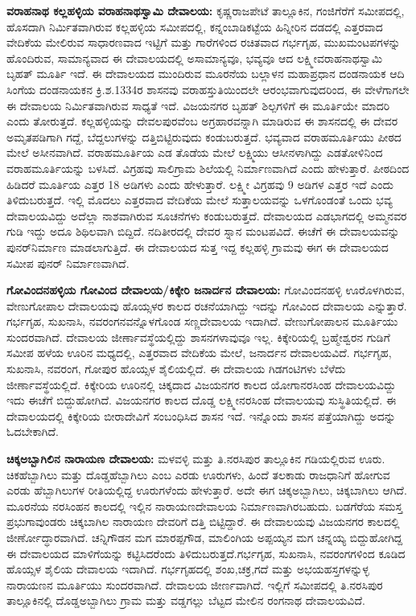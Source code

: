\textbf{ವರಾಹನಾಥ ಕಲ್ಲಹಳ್ಳಿಯ ವರಾಹನಾಥಸ್ವಾಮಿ ದೇವಾಲಯ:} ಕೃಷ್ಣರಾಜಪೇಟೆ ತಾಲ್ಲೂಕಿನ, ಗಂಜಿಗೆರೆಗೆ ಸಮೀಪದಲ್ಲಿ, ಹೊಸದಾಗಿ ನಿರ್ಮಿತವಾಗಿರುವ ಕಲ್ಲಹಳ್ಳಿಯ ಸಮೀಪದಲ್ಲಿ, ಕನ್ನಂಬಾಡಿಕಟ್ಟೆಯ ಹಿನ್ನೀರಿನ ದಡದಲ್ಲಿ ಎತ್ತರವಾದ ವೇದಿಕೆಯ ಮೇಲಿರುವ ಸಾಧಾರಣವಾದ ಇಟ್ಟಿಗೆ ಮತ್ತು ಗಾರೆಗಳಿಂದ ರಚಿತವಾದ ಗರ್ಭಗೃಹ, ಮುಖಮಂಟಪಗಳನ್ನು ಹೊಂದಿರುವ, ಸಾಮಾನ್ಯವಾದ ಈ ದೇವಾಲಯದಲ್ಲಿ ಅಸಾಮಾನ್ಯವೂ, ಭವ್ಯವೂ ಆದ ಲಕ್ಷ್ಮೀವರಾಹನಾಥಸ್ವಾಮಿ ಬೃಹತ್​ ಮೂರ್ತಿ ಇದೆ. ಈ ದೇವಾಲಯದ ಮುಂದಿರುವ ಮೂರನೆಯ ಬಲ್ಲಾಳನ ಮಹಾಪ್ರಧಾನ ದಂಡನಾಯಕ ಆದಿ ಸಿಂಗೆಯ ದಂಡನಾಯಕನ ಕ್ರಿ.ಶ.1334ರ ಶಾಸನವು ವರಾಹಸ್ತುತಿಯಿಂದಲೇ ಆರಂಭವಾಗುವುದರಿಂದ, ಈ ವೇಳೆಗಾಗಲೇ ಈ ದೇವಾಲಯ ನಿರ್ಮಿತವಾಗಿರುವ ಸಾಧ್ಯತೆ ಇದೆ. ವಿಜಯನಗರ ಬೃಹತ್​ ಶಿಲ್ಪಗಳಿಗೆ ಈ ಮೂರ್ತಿಯೇ ಮಾದರಿ ಎಂದು ತೋರುತ್ತದೆ. ಕಲ್ಲಹಳ್ಳಿಯನ್ನು ದೇವಲಪುರವೆಂಬ ಅಗ್ರಹಾರವನ್ನಾಗಿ ಮಾಡಿರುವ ಈ ಶಾಸನದಲ್ಲಿ ಈ ದೇವರ ಅಮೃತಪಡಿಗಾಗಿ ಗದ್ದೆ, ಬೆದ್ದಲುಗಳನ್ನು ದತ್ತಿಬಿಟ್ಟಿರುವುದು ಕಂಡುಬರುತ್ತದೆ. ಭವ್ಯವಾದ ವರಾಹಮೂರ್ತಿಯು ಪೀಠದ ಮೇಲೆ ಅಸೀನವಾಗಿದೆ. ವರಾಹಮೂರ್ತಿಯ ಎಡ ತೊಡೆಯ ಮೇಲೆ ಲಕ್ಷ್ಮಿಯು ಆಸೀನಳಾಗಿದ್ದು ಎಡತೋಳಿನಿಂದ ವರಾಹಮೂರ್ತಿಯನ್ನು ಬಳಸಿದೆ. ವಿಗ್ರಹವು ಸಾಲಿಗ್ರಾಮ ಶಿಲೆಯಲ್ಲಿ ನಿರ್ಮಾಣವಾಗಿದೆ ಎಂದು ಹೇಳುತ್ತಾರೆ. ಪೀಠದಿಂದ ಹಿಡಿದರೆ ಮೂರ್ತಿಯ ಎತ್ತರ 18 ಅಡಿಗಳು ಎಂದು ಹೇಳುತ್ತಾರೆ. ಲಕ್ಷ್ಮೀ ವಿಗ್ರಹವು 9 ಅಡಿಗಳ ಎತ್ತರ ಇದೆ ಎಂದು ತಿಳಿದುಬರುತ್ತದೆ. ಇಲ್ಲಿ ಮೊದಲು ಎತ್ತರವಾದ ವೇದಿಕೆಯ ಮೇಲೆ ಸುತ್ತಾಲಯವನ್ನು ಒಳಗೊಂಡಂತೆ ಒಂದು ಭವ್ಯ ದೇವಾಲಯವಿದ್ದು ಅದೆಲ್ಲಾ ನಾಶವಾಗಿರುವ ಸೂಚನೆಗಳು ಕಂಡುಬರುತ್ತದೆ. ದೇವಾಲಯದ ಎಡಭಾಗದಲ್ಲಿ ಅಮ್ಮನವರ ಗುಡಿ ಇದ್ದು ಅದೂ ಶಿಥಿಲವಾಗಿ ಬಿದ್ದಿದೆ. ನದಿತೀರದಲ್ಲಿ ದೇವರ ಸ್ನಾನ ಮಂಟಪವಿದೆ. ಈಚೆಗೆ ಈ ದೇವಾಲಯವನ್ನು ಪುನರ್​ನಿರ್ಮಾಣ ಮಾಡಲಾಗುತ್ತಿದೆ. ಈ ದೇವಾಲಯದ ಸುತ್ತ ಇದ್ದ ಕಲ್ಲಹಳ್ಳಿ ಗ್ರಾಮವು ಈಗ ಈ ದೇವಾಲಯದ ಸಮೀಪ ಪುನರ್​ ನಿರ್ಮಾಣವಾಗಿದೆ. 

\textbf{ಗೋವಿಂದನಹಳ್ಳಿಯ ಗೋವಿಂದ ದೇವಾಲಯ/ಕಿಕ್ಕೇರಿ ಜನಾರ್ದನ ದೇವಾಲಯ:} ಗೋವಿಂದನಹಳ್ಳಿ ಊರೊಳಗಿರುವ, ವೇಣುಗೋಪಾಲ ದೇವಾಲಯವು ಹೊಯ್ಸಳರ ಕಾಲದ ರಚನೆಯಾಗಿದ್ದು ಇದನ್ನು ಗೋವಿಂದ ದೇವಾಲಯ ಎನ್ನುತ್ತಾರೆ. ಗರ್ಭಗೃಹ, ಸುಖನಾಸಿ, ನವರಂಗನವನ್ನೊಳಗೊಂಡ ಸಣ್ಣದೇವಾಲಯ ಇದಾಗಿದೆ. ವೇಣುಗೋಪಾಲನ ಮೂರ್ತಿಯು ಸುಂದರವಾಗಿದೆ. ದೇವಾಲಯ ಜೀರ್ಣಾವಸ್ಥೆಯಲ್ಲಿದ್ದು ಶಾಸನಗಳಾವುವೂ ಇಲ್ಲ. ಕಿಕ್ಕೇರಿಯಲ್ಲಿ ಬ್ರಹ್ಮೇಶ್ವರನ ಗುಡಿಗೆ ಸಮೀಪ ಹಳೆಯ ಊರಿನ ಮಧ್ಯದಲ್ಲಿ, ಎತ್ತರವಾದ ವೇದಿಕೆಯ ಮೇಲೆ, ಜನಾರ್ದನ ದೇವಾಲಯವಿದೆ. ಗರ್ಭಗೃಹ, ಸುಖನಾಸಿ, ನವರಂಗ, ಗೋಪುರ ಹೊಯ್ಸಳ ಶೈಲಿಯಲ್ಲಿದೆ. ಈ ದೇವಾಲಯ ಗಿಡಗಂಟಿಗಳು ಬೆಳೆದು ಜೀರ್ಣಾವಸ್ಥೆಯಲ್ಲಿದೆ. ಕಿಕ್ಕೇರಿಯ ಊರಿನಲ್ಲಿ ಚಿಕ್ಕದಾದ ವಿಜಯನಗರ ಕಾಲದ ಯೋಗಾನರಸಿಂಹ ದೇವಾಲಯವಿದ್ದು ಇದು ಈಚೆಗೆ ಬಿದ್ದುಹೋಗಿದೆ. ವಿಜಯನಗರ ಕಾಲದ ದೊಡ್ಡ ಲಕ್ಷ್ಮೀನರಸಿಂಹ ದೇವಾಲಯವು ಸುಸ್ಥಿತಿಯಲ್ಲಿದೆ. ಈ ದೇವಾಲಯದಲ್ಲಿ ಕಿಕ್ಕೇರಿಯ ಬೀರಾದೇವಿಗೆ ಸಂಬಂಧಿಸಿದ ಶಾಸನ ಇದೆ. ಇನ್ನೊಂದು ಶಾಸನ ಪತ್ತೆಯಾಗಿದ್ದು ಅದನ್ನು ಓದಬೇಕಾಗಿದೆ. 

\textbf{ಚಿಕ್ಕಅಬ್ಬಾಗಿಲಿನ ನಾರಾಯಣ ದೇವಾಲಯ:} ಮಳವಳ್ಳಿ ಮತ್ತು ತಿ.ನರಸಿಪುರ ತಾಲ್ಲೂಕಿನ ಗಡಿಯಲ್ಲಿರುವ ಊರು. ಚಿಕಹೆಬ್ಬಾಗಿಲು ಮತ್ತು ದೊಡ್ಡಹೆಬ್ಬಾಗಿಲು ಎಂಬ ಎರಡು ಊರುಗಳು, ಹಿಂದೆ ತಲಕಾಡು ರಾಜಧಾನಿಗೆ ಹೋಗುವ ಎರಡು ಹೆಬ್ಬಾಗಿಲುಗಳ ರೀತಿಯಲ್ಲಿದ್ದ ಊರುಗಳೆಂದು ಹೇಳುತ್ತಾರೆ. ಅದೇ ಈಗ ಚಿಕ್ಕಅಬ್ಬಾಗಿಲು, ಚಿಕ್ಕಬಾಗಿಲು ಆಗಿದೆ. ಮೂರನೆಯ ನರಸಿಂಹನ ಕಾಲದಲ್ಲಿ ಇಲ್ಲಿನ ನಾರಾಯಣದೇವಾಲಯ ನಿರ್ಮಾಣವಾಗಿರಬಹುದು. ಬಡಗೆರೆಯ ಸಮಸ್ತ ಪ್ರಭುಗಾವುಂಡರು ಚಿಕ್ಕಬಾಗಿಲ ನಾರಾಯಣ ದೇವರಿಗೆ ದತ್ತಿ ಬಿಟ್ಟಿದ್ದಾರೆ. ಈ ದೇವಾಲಯವು ವಿಜಯನಗರ ಕಾಲದಲ್ಲಿ ಜೀರ್ಣೋದ್ಧಾರವಾಗಿದೆ. ಚನ್ನಿಗೌಡನ ಮಗ ಮಾರಪ್ಪಗೌಡ, ಮಾಲಿಂಗಿಯ ಅಪ್ಪಯ್ಯನ ಮಗ ಚನ್ನಯ್ಯ ಬಿದ್ದುಹೋಗಿದ್ದ ಈ ದೇವಾಲಯದ ಮಾಳಿಗೆಯನ್ನು ಕಟ್ಟಿಸಿದರೆಂದು ತಿಳಿದುಬರುತ್ತದೆ.ಗರ್ಭಗೃಹ, ಸುಖನಾಸಿ, ನವರಂಗಗಳಿಂದ ಕೂಡಿದ ಹೊಯ್ಸಳ ಶೈಲಿಯ ದೇವಾಲಯ ಇದಾಗಿದೆ. ಗರ್ಭಗೃಹದಲ್ಲಿ ಶಂಖ,ಚಕ್ರ,ಗದೆ ಮತ್ತು ಅಭಯಹಸ್ತಗಳನ್ನುಳ್ಳ ನಾರಾಯಣನ ಮೂರ್ತಿಯು ಸುಂದರವಾಗಿದೆ. ದೇವಾಲಯ ಜೀರ್ಣವಾಗಿದೆ. ಇಲ್ಲಿಗೆ ಸಮೀಪದಲ್ಲಿ ತಿ.ನರಸಿಪುರ ತಾಲ್ಲೂಕಿನಲ್ಲಿ ದೊಡ್ಡಅಬ್ಬಾಗಿಲು ಗ್ರಾಮ ಮತ್ತು ವಡ್ಡಗಲ್ಲು ಬೆಟ್ಟದ ಮೇಲಿನ ರಂಗನಾಥ ದೇವಾಲಯವಿದೆ.

